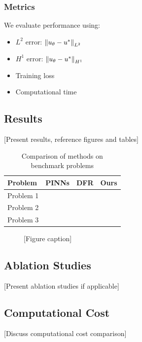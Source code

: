 \subsubsection{Metrics}

We evaluate performance using:
\begin{itemize}
    \item $L^2$ error: $\left\|u_\theta - u^*\right\|_{L^2}$
    \item $H^1$ error: $\left\|u_\theta - u^*\right\|_{H^1}$
    \item Training loss
    \item Computational time
\end{itemize}

\subsection{Results}

[Present results, reference figures and tables]

\begin{table}[htbp]
\centering
\caption{Comparison of methods on benchmark problems}
\label{tab:results}
\begin{tabular}{lccc}
\toprule
Problem & PINNs & DFR & Ours \\
\midrule
Problem 1 & & & \\
Problem 2 & & & \\
Problem 3 & & & \\
\bottomrule
\end{tabular}
\end{table}

\begin{figure}[htbp]
\centering
\caption{[Figure caption]}
\label{fig:results}
\end{figure}

\subsection{Ablation Studies}

[Present ablation studies if applicable]

\subsection{Computational Cost}

[Discuss computational cost comparison]
